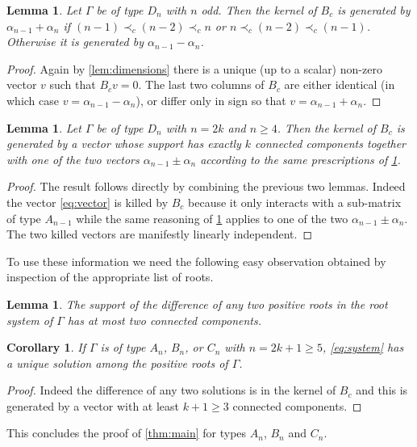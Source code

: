 \documentclass[11pt]{amsart}
\newtheorem{corollary}[theorem]{Corollary}
\newtheorem{lemma}[theorem]{Lemma}
\theoremstyle{definition}
\numberwithin{equation}{section}
\numberwithin{figure}{section}
\begin{document}
  \begin{lemma}
    \label{lem:ker_Dn_even}
    Let $\Gamma$ be of type $D_n$ with $n$ odd.
    Then the kernel of $B_c$ is generated by $\alpha_{n-1}+\alpha_n$ if $(n-1) \prec_c (n-2) \prec_c n$ or $n \prec_c (n-2) \prec_c (n-1)$.
    Otherwise it is generated by $\alpha_{n-1}-\alpha_n$.
  \end{lemma}
  \begin{proof}
    Again by \cref{lem:dimensions} there is a unique (up to a scalar) non-zero vector $v$ such that $B_cv=0$.
    The last two columns of $B_c$ are either identical (in which case $v=\alpha_{n-1}-\alpha_n$), or differ only in sign so that $v=\alpha_{n-1}+\alpha_n$.
  \end{proof}

  \begin{lemma}
    Let $\Gamma$ be of type $D_n$ with $n=2k$ and $n\geq 4$.
    Then the kernel of $B_c$ is generated by a vector whose support has exactly $k$ connected components together with one of the two vectors $\alpha_{n-1}\pm\alpha_n$ according to the same prescriptions of \cref{lem:ker_Dn_even}.
  \end{lemma}
  \begin{proof}
    The result follows directly by combining the previous two lemmas. 
    Indeed the vector \cref{eq:vector} is killed by $B_c$ because it only interacts with a sub-matrix of type $A_{n-1}$ while the same reasoning of \cref{lem:ker_Dn_even} applies to one of the two $\alpha_{n-1}\pm\alpha_n$.
    The two killed vectors are manifestly linearly independent.
  \end{proof}

  To use these information we need the following easy observation obtained by inspection of the appropriate list of roots.
  \begin{lemma}
    The support of the difference of any two positive roots in the root system of $\Gamma$ has at most two connected components.
  \end{lemma}

  \begin{corollary}
    If $\Gamma$ is of type $A_n$, $B_n$, or $C_n$ with $n=2k+1\geq 5$, \cref{eq:system} has a unique solution among the positive roots of $\Gamma$.
  \end{corollary}
  \begin{proof}
    Indeed the difference of any two solutions is in the kernel of $B_c$ and this is generated by a vector with at least $k+1\geq3$ connected components.
  \end{proof}
  This concludes the proof of \cref{thm:main} for types $A_n$, $B_n$ and $C_n$.
\end{document}
